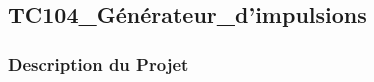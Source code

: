 \documentclass[a4paper,12pt]{report}
\begin{document}
\subsection{TC104\_Générateur\_d'impulsions}
\begin{center}
\label{}
\end{center}
\subsubsection{Description du Projet}
\end{document}
